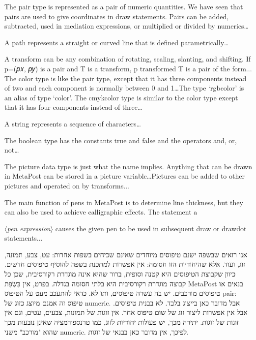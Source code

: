 {The pair type is represented as a pair of numeric quantities. We have seen that pairs are used to give coordinates in draw statements. Pairs can be added, subtracted, used in mediation expressions, or multiplied or divided by numerics…

A path represents a straight or curved line that is defined parametrically…

A transform can be any combination of rotating, scaling, slanting, and
shifting. If p=(𝑝𝑥, 𝑝𝑦) is a pair and T is a transform, p transformed T
is a pair of the form...
The color type is like the pair type, except that it has three components
instead of two and each component is normally between 0 and 1…The type
‘rgbcolor’ is an alias of type ‘color’. The cmykcolor type is similar to the
color type except that it has four components instead of three…

A string represents a sequence of characters…

The boolean type has the constants true and false and the operators and, or,
not…

The picture data type is just what the name implies. Anything that can be
drawn in MetaPost can be stored in a picture variable…Pictures can be added to
other pictures and operated on by transforms...

The main function of pens in MetaPost is to determine line thickness, but
they can also be used to achieve calligraphic effects. The statement a
~

$⟨${\itshape pen expression}$⟩$ causes the given pen to be used
in subsequent draw or drawdot statements...

אנו רואים שבשפה ישנם טיפוסים מיוחדים שאינם שכיחים בשפות אחרות: עט, צבע, תמונה,
זוג, ועוד. אלא שהיחודיות הזו חסומה: אין אפשרות למתכנת בשפה להוסיף טיפוסים
חדשים. כיוון שקבוצת הטיפוסים היא קטנה וסופית, ברור שהיא אינה מוגדרת רקורסיבית,
שכן כל קבוצה מוגדרת רקורסיבית היא בלתי חסומה בגדלה. בפרט, אין בִּשְׂפַת MetaPost
בנאים או טיפוסים מורכבים. יש בה עשרה טיפוסים, ותו לא. כדאי להתעכב מעט על
הטיפוס pair: טיפוס זה אמנם מיוצג כזוג של numeric. אבל מדובר כאן בייצוג בלבד. לא
בבנית טיפוסים. אבל אין אפשרות ליצור זוג של שום טיפוס אחר. אין זוגות של תמונות,
צבעים, עטים, וגם אין זוגות של זוגות. יתירה מכך, יש פעולות יחודיות לזוג, כמו
טרנספורמציה שאינן נובעות מכך שהוא "מורכב" משני numeric. לפיכך, אין מדובר כאן
בבנאי של זוגות.

}
